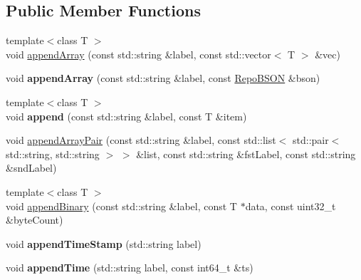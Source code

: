 \subsection*{Public Member Functions}
\begin{DoxyCompactItemize}
\item 
{\footnotesize template$<$class T $>$ }\\void \hyperlink{classrepo_1_1core_1_1model_1_1_repo_b_s_o_n_builder_aac9e1ec05f85927b326da215e5505d94}{append\+Array} (const std\+::string \&label, const std\+::vector$<$ T $>$ \&vec)
\item 
\hypertarget{classrepo_1_1core_1_1model_1_1_repo_b_s_o_n_builder_ab0171c8ddcfc1064620085706ec80109}{}void {\bfseries append\+Array} (const std\+::string \&label, const \hyperlink{classrepo_1_1core_1_1model_1_1_repo_b_s_o_n}{Repo\+B\+S\+O\+N} \&bson)\label{classrepo_1_1core_1_1model_1_1_repo_b_s_o_n_builder_ab0171c8ddcfc1064620085706ec80109}

\item 
\hypertarget{classrepo_1_1core_1_1model_1_1_repo_b_s_o_n_builder_ac244225245e865c8bee66a56bcf4137a}{}{\footnotesize template$<$class T $>$ }\\void {\bfseries append} (const std\+::string \&label, const T \&item)\label{classrepo_1_1core_1_1model_1_1_repo_b_s_o_n_builder_ac244225245e865c8bee66a56bcf4137a}

\item 
void \hyperlink{classrepo_1_1core_1_1model_1_1_repo_b_s_o_n_builder_a21d4b0241bfc9d1c05cd7050d9b87b3e}{append\+Array\+Pair} (const std\+::string \&label, const std\+::list$<$ std\+::pair$<$ std\+::string, std\+::string $>$ $>$ \&list, const std\+::string \&fst\+Label, const std\+::string \&snd\+Label)
\item 
{\footnotesize template$<$class T $>$ }\\void \hyperlink{classrepo_1_1core_1_1model_1_1_repo_b_s_o_n_builder_aabe573365190367c7a3bd52692cd7a66}{append\+Binary} (const std\+::string \&label, const T $\ast$data, const uint32\+\_\+t \&byte\+Count)
\item 
\hypertarget{classrepo_1_1core_1_1model_1_1_repo_b_s_o_n_builder_ac886e9d0599b53c4bdf0bf00bfbf95da}{}void {\bfseries append\+Time\+Stamp} (std\+::string label)\label{classrepo_1_1core_1_1model_1_1_repo_b_s_o_n_builder_ac886e9d0599b53c4bdf0bf00bfbf95da}

\item 
\hypertarget{classrepo_1_1core_1_1model_1_1_repo_b_s_o_n_builder_a7797970aa65feafae46eaea2b4246c35}{}void {\bfseries append\+Time} (std\+::string label, const int64\+\_\+t \&ts)\label{classrepo_1_1core_1_1model_1_1_repo_b_s_o_n_builder_a7797970aa65feafae46eaea2b4246c35}


\end{DoxyCompactItemize}
